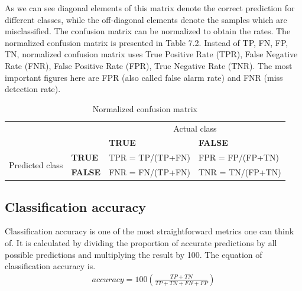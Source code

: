 As we can see diagonal elements of this matrix denote the correct prediction for different classes, while the off-diagonal elements denote the samples which are misclassified.
The confusion matrix can be normalized to obtain the rates. The normalized confusion matrix is presented in Table 7.2. Instead of TP, FN, FP, TN, normalized confusion matrix uses True Positive Rate (TPR), False Negative Rate (FNR), False Positive Rate (FPR), True Negative Rate (TNR). The most important figures here are FPR (also called false alarm rate) and FNR (miss detection rate).

\begin{table}[h!]
	\begin{tabular}{llll}
													   &                            & \multicolumn{2}{c}{Actual class}                                                 \\ \cline{3-4} 
													   & \multicolumn{1}{l|}{}      & \multicolumn{1}{l|}{\textbf{TRUE}}                & \multicolumn{1}{l|}{\textbf{FALSE}}               \\ \cline{2-4} 
	\multicolumn{1}{c|}{\multirow{2}{*}{Predicted class}} & \multicolumn{1}{l|}{\textbf{TRUE}}  & \multicolumn{1}{l|}{TPR = TP/(TP+FN)}  & \multicolumn{1}{l|}{FPR = FP/(FP+TN)} \\ \cline{2-4} 
	\multicolumn{1}{c|}{}                              & \multicolumn{1}{l|}{\textbf{FALSE}} & \multicolumn{1}{l|}{FNR = FN/(TP+FN)} & \multicolumn{1}{l|}{TNR = TN/(FP+TN)}  \\ \cline{2-4} 
	\end{tabular}
	\caption{\label{demo-table-4} Normalized confusion matrix}
\end{table} 

\subsection{Classification accuracy}
\hspace{0.5cm}Classification accuracy is one of the most straightforward metrics one can think of. It is calculated by dividing the proportion of accurate predictions by all possible predictions and multiplying the result by 100. The equation of classification accuracy is.
\begin{align*}
	accuracy = 100\left (\frac{TP + TN}{TP + TN + FN + FP}  \right )
\end{align*}

